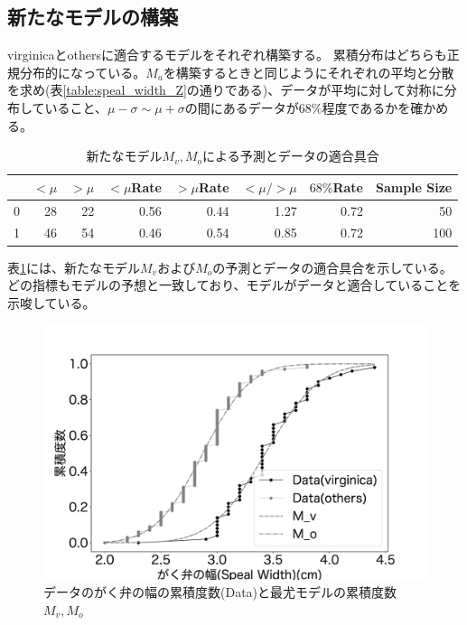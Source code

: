 \subsection{新たなモデルの構築}
virginicaとothersに適合するモデルをそれぞれ構築する。
累積分布はどちらも正規分布的になっている。$M_a$を構築するときと同じようにそれぞれの平均と分散を求め(表\ref{table:speal_width_Z}の通りである)、データが平均に対して対称に分布していること、$\mu-\sigma\sim\mu+\sigma$の間にあるデータが$68\%$程度であるかを確かめる。

\begin{table}
 \caption{新たなモデル$M_v,M_o$による予測とデータの適合具合}
 \label{table:speal_width_replace_model}
 \begin{tabular}{lrrrrrrr}
  \hline
  {} &  $<\mu$ &  $>\mu$ &  $<\mu$Rate &  $>\mu$Rate &  $<\mu/>\mu$  &  $68\%$Rate &  Sample Size \\
  \hline \hline
  0 &   28 &   22 &     0.56 &     0.44 &      1.27 &     0.72 &           50 \\
  1 &   46 &   54 &     0.46 &     0.54 &      0.85 &     0.72 &          100 \\
  \hline
 \end{tabular}
\end{table}   

表\ref{table:speal_width_replace_model}には、新たなモデル$M_v$および$M_o$の予測とデータの適合具合を示している。
どの指標もモデルの予想と一致しており、モデルがデータと適合していることを示唆している。

\begin{figure}
 \begin{center}
  \includegraphics[width=15cm]{./image/15_/speal_width_viri_model.pdf}
  \caption{データのがく弁の幅の累積度数(Data)と最尤モデルの累積度数$M_v,M_o$}
  \label{fig:speal_width_viri_model}
 \end{center}
\end{figure}

